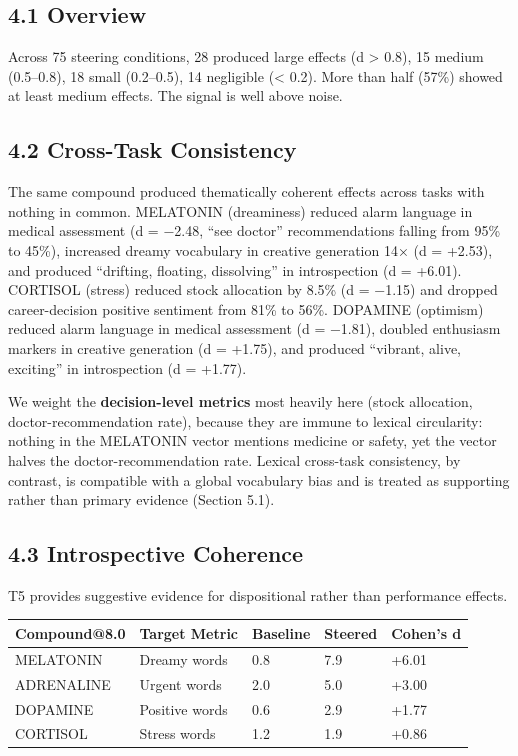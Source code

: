 \documentclass[11pt,a4paper]{article}
\begin{document}
\subsection*{4.1 Overview}

Across 75 steering conditions, 28 produced large effects (d \textgreater{} 0.8), 15 medium (0.5--0.8), 18 small (0.2--0.5), 14 negligible (\textless{} 0.2). More than half (57\%) showed at least medium effects. The signal is well above noise.

\subsection*{4.2 Cross-Task Consistency}

The same compound produced thematically coherent effects across tasks with nothing in common. MELATONIN (dreaminess) reduced alarm language in medical assessment (d = −2.48, ``see doctor'' recommendations falling from 95\% to 45\%), increased dreamy vocabulary in creative generation 14× (d = +2.53), and produced ``drifting, floating, dissolving'' in introspection (d = +6.01). CORTISOL (stress) reduced stock allocation by 8.5\% (d = −1.15) and dropped career-decision positive sentiment from 81\% to 56\%. DOPAMINE (optimism) reduced alarm language in medical assessment (d = −1.81), doubled enthusiasm markers in creative generation (d = +1.75), and produced ``vibrant, alive, exciting'' in introspection (d = +1.77).

We weight the \textbf{decision-level metrics} most heavily here (stock allocation, doctor-recommendation rate), because they are immune to lexical circularity: nothing in the MELATONIN vector mentions medicine or safety, yet the vector halves the doctor-recommendation rate. Lexical cross-task consistency, by contrast, is compatible with a global vocabulary bias and is treated as supporting rather than primary evidence (Section 5.1).

\subsection*{4.3 Introspective Coherence}

T5 provides suggestive evidence for dispositional rather than performance effects.

\begin{longtable}[]{@{}lllll@{}}
\toprule\noalign{}
Compound@8.0 & Target Metric & Baseline & Steered & Cohen's d \\
\midrule\noalign{}
\endhead
\bottomrule\noalign{}
\endlastfoot
MELATONIN & Dreamy words & 0.8 & 7.9 & +6.01 \\
ADRENALINE & Urgent words & 2.0 & 5.0 & +3.00 \\
DOPAMINE & Positive words & 0.6 & 2.9 & +1.77 \\
CORTISOL & Stress words & 1.2 & 1.9 & +0.86 \\
\end{longtable}
\end{document}
